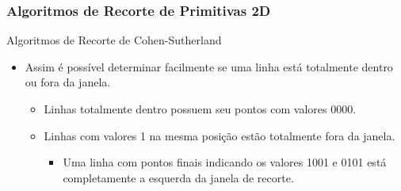 \documentclass{beamer}
\begin{document}
\begin{frame}
\frametitle{Algoritmos de Recorte de Primitivas 2D}

	\begin{block}{Algoritmos de Recorte de Cohen-Sutherland}
		\begin{itemize}
			\item Assim é possível determinar facilmente se uma linha está totalmente dentro ou fora da janela.
			\begin{itemize}
				\item Linhas totalmente dentro possuem seu pontos com valores 0000.
				\item Linhas com valores 1 na mesma posição estão totalmente fora da janela.
					\begin{itemize}
						\item Uma linha com pontos finais indicando os valores 1001 e 0101 está completamente a esquerda da janela de recorte.
					\end{itemize}
			\end{itemize}
		\end{itemize}
	\end{block}
	
	\begin{figure}[!h]
			\begin{center}
				\qquad
				\qquad
				
			\end{center}
	\end{figure}	
\end{frame}
\end{document}

